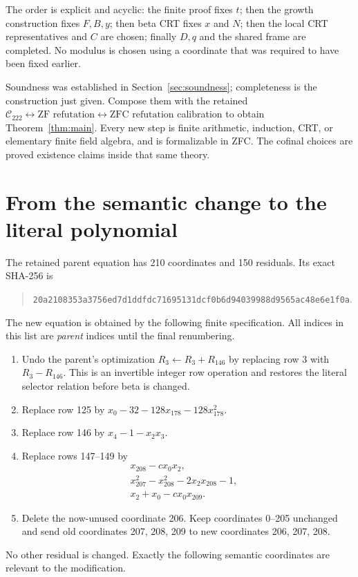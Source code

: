\documentclass[11pt]{article}
\theoremstyle{definition}
\theoremstyle{remark}
\newcommand{\Ccal}{\mathcal C_{222}}
\begin{document}
The order is explicit and acyclic: the finite proof fixes $t$; then the
growth construction fixes $F,B,y$; then beta CRT fixes $x$ and $N$; then
the local CRT representatives and $C$ are chosen; finally $D,q$ and the
shared frame are completed. No modulus is chosen using a coordinate that
was required to have been fixed earlier.

Soundness was established in Section~\ref{sec:soundness}; completeness is
the construction just given. Compose them with the retained
$\Ccal\leftrightarrow\text{ZF refutation}\leftrightarrow
\text{ZFC refutation}$ calibration to obtain Theorem~\ref{thm:main}.
Every new step is finite arithmetic, induction, CRT, or elementary finite
field algebra, and is formalizable in ZFC. The cofinal choices are proved
existence claims inside that same theory.

\section{From the semantic change to the literal polynomial}
\label{sec:literal}

The retained parent equation has 210 coordinates and 150 residuals.
Its exact SHA-256 is
\begin{quote}\small\ttfamily
\nolinkurl{20a2108353a3756ed7d1ddfdc71695131dcf0b6d94039988d9565ac48e6e1f0a}.
\end{quote}
The new equation is obtained by the following finite specification.
All indices in this list are \emph{parent} indices until the final
renumbering.
\begin{enumerate}
\item Undo the parent's optimization $R_3\gets R_3+R_{146}$ by
replacing row 3 with $R_3-R_{146}$. This is an invertible integer row
operation and restores the literal selector relation before beta is changed.
\item Replace row 125 by
$x_0-32-128x_{178}-128x_{178}^2$.
\item Replace row 146 by $x_4-1-x_2x_3$.
\item Replace rows 147--149 by
\begin{align*}
 x_{208}-c x_0x_2,&\\
 x_{207}^2-x_{208}^2-2x_2x_{208}-1,&\\
 x_2+x_0-cx_0x_{209}.&
\end{align*}
\item Delete the now-unused coordinate 206. Keep coordinates 0--205
unchanged and send old coordinates 207, 208, 209 to new coordinates
206, 207, 208.
\end{enumerate}
No other residual is changed. Exactly the following semantic coordinates
are relevant to the modification.
\end{document}
